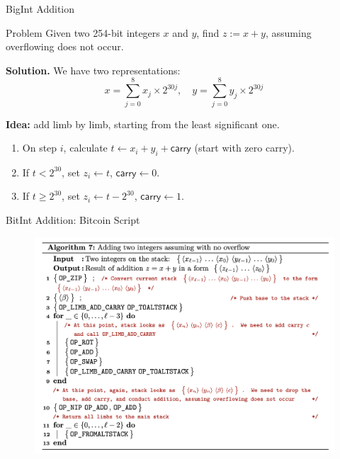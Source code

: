 \documentclass{zkdl-presentation-template}
\begin{document}
    \begin{frame}{BigInt Addition}
        \begin{block}{Problem}
            Given two 254-bit integers $x$ and $y$, find $z := x+y$, assuming overflowing does not occur.
        \end{block}

        \textbf{Solution.} We have two representations:
        \begin{equation*}
            x = \sum_{j=0}^8 x_j \times 2^{30j}, \quad y = \sum_{j=0}^8 y_j \times 2^{30j}
        \end{equation*}

        \textbf{Idea:} add limb by limb, starting from the least significant one.

        \begin{enumerate}
            \item On step $i$, calculate $t \gets x_i + y_i + \mathsf{carry}$ (start with zero carry).
            \item If $t < 2^{30}$, set $z_i \gets t$, $\mathsf{carry} \gets 0$.
            \item If $t \geq 2^{30}$, set $z_i \gets t-2^{30}$, $\mathsf{carry} \gets 1$.
        \end{enumerate}
    \end{frame}

    \begin{frame}{BitInt Addition: Bitcoin Script}
        \begin{figure}
            \centering
            \includegraphics[width=\linewidth]{images/bigint_add.png}
        \end{figure}
    \end{frame}
\end{document}
